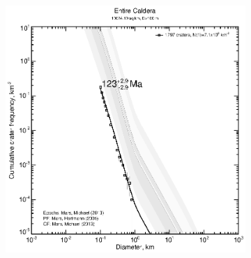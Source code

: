 \documentclass[12pt,letter]{article}
\begin{document}
\begin{figure}[h]
\begin{subfigure}{.33\textwidth}
\end{subfigure}
\begin{subfigure}{.33\textwidth}
  \includegraphics[width=\linewidth,clip,trim=1cm 1cm 1.5cm 1cm]{figures/craterstats/arsia_fullarea_100m_cum.eps}
\end{subfigure}
\end{figure}
\end{document}
